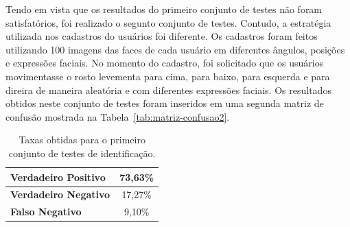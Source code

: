 	Tendo em vista que os resultados do primeiro conjunto de testes não foram satisfatórios, foi realizado o segunto conjunto de testes. Contudo, a estratégia utilizada nos cadastros do usuários foi diferente. Os cadastros foram feitos utilizando 100 imagens das faces de cada usuário em diferentes ângulos, posições e expressões faciais. No momento do cadastro, foi solicitado que os usuários movimentasse o rosto levementa para cima, para baixo, para esquerda e para direira de maneira aleatória e com diferentes expressões faciais. Os resultados obtidos neste conjunto de testes foram inseridos em uma segunda matriz de confusão mostrada na Tabela~\ref{tab:matriz-confusao2}.

	\begin{table}[htb]
		\begin{center}
			\caption{Taxas obtidas para o primeiro conjunto de testes de identificação.}
			\label{tab:taxas}
			\begin{tabular}{|l|c|}
				\hline \bf Verdadeiro Positivo & 73,63\% \\
				\hline \bf Verdadeiro Negativo & 17,27\% \\
				\hline \bf Falso Negativo & 9,10\% \\
				\hline
			\end{tabular}
		\end{center}
	\end{table}



				 

